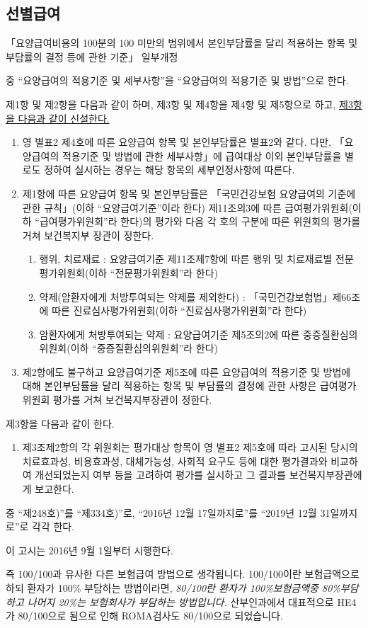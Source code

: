 \subsection{선별급여}
「요양급여비용의 100분의 100 미만의 범위에서 본인부담률을 달리 적용하는 항목 및 부담률의 결정 등에 관한 기준」 일부개정\par
\begin{description}\tightlist	
\item[제1조] 중 “요양급여의 적용기준 및 세부사항”을 “요양급여의 적용기준 및 방법”으로 한다.
\item[제3조] 제1항 및 제2항을 다음과 같이 하며, 제3항 및 제4항을 제4항 및 제5항으로 하고, \uline{제3항을 다음과 같이 신설한다.} 
	\begin{enumerate}[①]\tightlist
	\item 영 별표2 제4호에 따른 요양급여 항목 및 본인부담률은 별표2와 같다. 다만, 「요양급여의 적용기준 및 방법에 관한 세부사항」에 급여대상 이외 본인부담률을 별로도 정하여 실시하는 경우는 해당 항목의 세부인정사항에 따른다. 
	\item 제1항에 따른 요양급여 항목 및 본인부담률은 「국민건강보험 요양급여의 기준에 관한 규칙」(이하 “요양급여기준”이라 한다) 제11조의3에 따른 급여평가위원회(이하 “급여평가위원회”라 한다)의 평가와 다음 각 호의 구분에 따른 위원회의 평가를 거쳐 보건복지부 장관이 정한다. 
		\begin{enumerate}[1.]\tightlist
		\item 행위, 치료재료 : 요양급여기준 제11조제7항에 따른 행위 및 치료재료별 전문평가위원회(이하 “전문평가위원회”라 한다)
		\item 약제(암환자에게 처방\bullet 투여되는 약제를 제외한다) : 「국민건강보험법」제66조에 따른 진료심사평가위원회(이하 “진료심사평가위원회”라 한다)
		\item 암환자에게 처방\bullet 투여되는 약제 : 요양급여기준 제5조의2에 따른 중증질환심의위원회(이하 “중증질환심의위원회”라 한다)
		\end{enumerate}
	\item 제2항에도 불구하고 요양급여기준 제5조에 따른 요양급여의 적용기준 및 방법에 대해 본인부담률을 달리 적용하는 항목 및 부담률의 결정에 관한 사항은 급여평가위원회 평가를 거쳐 보건복지부장관이 정한다. 
	\end{enumerate}
\item[제9조] 제3항을 다음과 같이 한다. 
	\begin{enumerate}[③]\tightlist
	\item 제3조제2항의 각 위원회는 평가대상 항목이 영 별표2 제5호에 따라 고시된 당시의 치료효과성, 비용효과성, 대체가능성, 사회적 요구도 등에 대한 평가결과와 비교하여 개선되었는지 여부 등을 고려하여 평가를 실시하고 그 결과를 보건복지부장관에게 보고한다. 
	\end{enumerate}
\item[제11조] 중 “제248호)”를 “제334호)”로, “2016년 12월 17일까지로”를 “2019년 12월 31일까지로”로 각각 한다. 
\end{description}
이 고시는 2016년 9월 1일부터 시행한다.\par
즉 100/100과 유사한 다른 보험급여 방법으로 생각됩니다. 100/100이란 보험급액으로 하되 환자가 100\% 부담하는 방법이라면, \emph{80/100란 환자가 100\%보험금액중 80\%부담하고 나머지 20\%는 보험회사가 부담하는 방법입니다.} 산부인과에서 대표적으로 HE4가 80/100으로 됨으로 인해 ROMA검사도 80/100으로 되었습니다.
